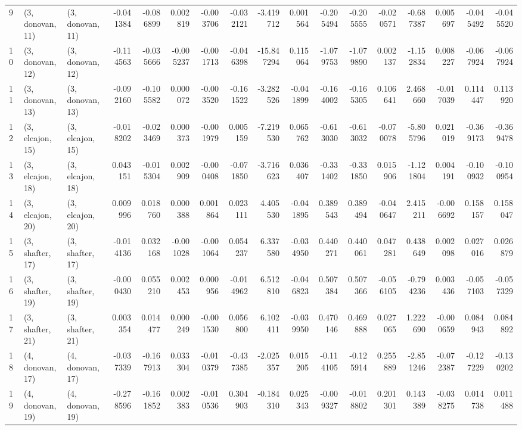 \begin{tabular}{lllrrrrrrrrrrrrrr}
9  &  (3, donovan, 11) &  (3, donovan, 11) & -0.041384 & -0.086899 &   0.002819 & -0.003706 & -0.032121 &  -3.419712 &  0.001564 &  -0.205494 & -0.205555 & -0.020571 & -0.687387 &  0.005697 & -0.045492 & -0.045520 \\
10 &  (3, donovan, 12) &  (3, donovan, 12) & -0.114563 & -0.035666 &  -0.005237 & -0.001713 & -0.046398 & -15.847294 &  0.115064 &  -1.079753 & -1.079890 &  0.002137 & -1.152834 &  0.008227 & -0.067924 & -0.067924 \\
11 &  (3, donovan, 13) &  (3, donovan, 13) & -0.092160 & -0.105582 &   0.000072 & -0.003520 & -0.161522 &  -3.282526 & -0.041899 &  -0.164002 & -0.165305 &  0.106641 &  2.468660 & -0.017039 &  0.114447 &  0.113920 \\
12 &  (3, elcajon, 15) &  (3, elcajon, 15) & -0.018202 & -0.023469 &   0.000373 & -0.001979 &  0.005159 &  -7.219530 &  0.065762 &  -0.613030 & -0.613032 & -0.070078 & -5.805796 &  0.021019 & -0.369173 & -0.369478 \\
13 &  (3, elcajon, 18) &  (3, elcajon, 18) &  0.043151 & -0.015304 &   0.002909 & -0.000408 & -0.071850 &  -3.716623 &  0.036407 &  -0.331402 & -0.331850 &  0.015906 & -1.121804 &  0.004191 & -0.100932 & -0.100954 \\
14 &  (3, elcajon, 20) &  (3, elcajon, 20) &  0.009996 &  0.018760 &   0.000388 &  0.001864 &  0.023111 &   4.405530 & -0.041895 &   0.389543 &  0.389494 & -0.040647 &  2.415211 & -0.006692 &  0.158157 &  0.158047 \\
15 &  (3, shafter, 17) &  (3, shafter, 17) & -0.014136 &  0.032168 &  -0.001028 & -0.001064 &  0.054237 &   6.337580 & -0.034950 &   0.440271 &  0.440061 &  0.047281 &  0.438649 &  0.002098 &  0.027016 &  0.026879 \\
16 &  (3, shafter, 19) &  (3, shafter, 19) & -0.000430 &  0.055210 &   0.002453 &  0.000956 & -0.014962 &   6.512810 & -0.046823 &   0.507384 &  0.507366 & -0.056105 & -0.794236 &  0.003436 & -0.057103 & -0.057329 \\
17 &  (3, shafter, 21) &  (3, shafter, 21) &  0.003354 &  0.014477 &   0.000249 & -0.001530 &  0.056800 &   6.102411 & -0.039950 &   0.470146 &  0.469888 &  0.027065 &  1.222690 & -0.000659 &  0.084943 &  0.084892 \\
18 &  (4, donovan, 17) &  (4, donovan, 17) & -0.037339 & -0.167913 &   0.033304 & -0.010379 & -0.437385 &  -2.025357 &  0.015205 &  -0.114105 & -0.125914 &  0.255889 & -2.851246 & -0.072387 & -0.127229 & -0.130202 \\
19 &  (4, donovan, 19) &  (4, donovan, 19) & -0.278596 & -0.161852 &   0.002383 & -0.010536 &  0.304903 &  -0.184310 &  0.025343 &  -0.009327 & -0.018802 &  0.201301 &  0.143389 & -0.038275 &  0.014738 &  0.011488 \\

\end{tabular}
